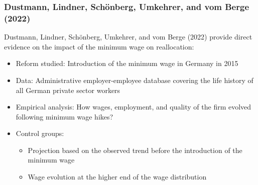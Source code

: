         \subsubsection{Dustmann, Lindner, Schönberg, Umkehrer, and vom Berge (2022)}
            Dustmann, Lindner, Schönberg, Umkehrer, and vom Berge (2022) provide direct evidence on the impact of the minimum wage on reallocation:
            \begin{itemize}
                \item Reform studied: Introduction of the minimum wage in Germany in 2015
                \item Data: Administrative employer-employee database covering the life history of all German private sector workers
                \item Empirical analysis: How wages, employment, and quality of the firm evolved following minimum wage hikes?
                \item Control groups:
                    \begin{itemize}
                        \item Projection based on the observed trend before the introduction of the minimum wage
                        \item Wage evolution at the higher end of the wage distribution
                    \end{itemize}
            \end{itemize}
            

